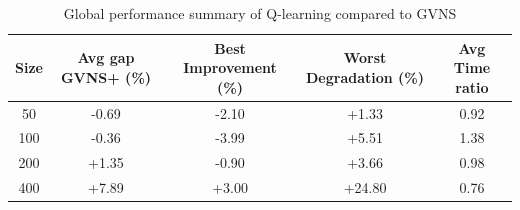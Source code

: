 \begin{table}[ht]
\centering
\footnotesize
\setlength{\tabcolsep}{4pt}
\caption{Global performance summary of Q-learning compared to GVNS}
\vspace{3mm}
\begin{tabular}{c c c c c}
\toprule
\textbf{Size} & \textbf{Avg gap GVNS+ (\%)} & \textbf{Best Improvement (\%)} & \textbf{Worst Degradation (\%)} & \textbf{Avg Time ratio} \\
\midrule
50  & -0.69 & -2.10 & +1.33  & 0.92 \\
100 & -0.36 & -3.99 & +5.51  & 1.38 \\
200 & +1.35 & -0.90 & +3.66  & 0.98 \\
400 & +7.89 & +3.00 & +24.80 & 0.76 \\
\bottomrule
\end{tabular}
\label{tab:qlearning_summary}
\end{table}